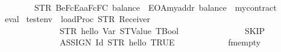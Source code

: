 \begin{isabellebody}
\ \ \ \ \ \ \ \ \ \ \ \ {\isacharbrackleft}{\kern0pt}{\isacharbrackright}{\kern0pt}\isanewline
\ \ \ \ \ \ \ {\isacharequal}{\kern0pt}\ STR\ {\isacharprime}{\kern0pt}{\isacharprime}{\kern0pt}{}{}{}Be{}{}{}{}FcEa{}{}aF{}{}{}{}{}{}{}{}{}c{}{}F{}{}{}{}{}{}C{}{}{}{\isacharcolon}{\kern0pt}\ balance{\isacharequal}{\kern0pt}{\isacharequal}{\kern0pt}{}{}\ {\isacharminus}{\kern0pt}\ EOA{\isasymnewline}myaddr{\isacharcolon}{\kern0pt}\ balance{\isacharequal}{\kern0pt}{\isacharequal}{\kern0pt}{}{}{}\ {\isacharminus}{\kern0pt}\ mycontract{\isacharparenleft}{\kern0pt}{\isacharparenright}{\kern0pt}{\isacharprime}{\kern0pt}{\isacharprime}{\kern0pt}{\isachardoublequoteclose}\isanewline
%
\isadelimproof
\ \ %
\endisadelimproof
%
\isatagproof
{}\isamarkupfalse%
\ {\isacharparenleft}{\kern0pt}eval{\isacharparenright}{\kern0pt}%
\endisatagproof
{\isafoldproof}%
%
\isadelimproof
\isanewline
%
\endisadelimproof
\isanewline
{}\isamarkupfalse%
\ {\isachardoublequoteopen}testenv{}\ {\isasymequiv}\ loadProc\ {\isacharparenleft}{\kern0pt}STR\ {\isacharprime}{\kern0pt}{\isacharprime}{\kern0pt}Receiver{\isacharprime}{\kern0pt}{\isacharprime}{\kern0pt}{\isacharparenright}{\kern0pt}\isanewline
\ \ \ \ \ \ \ \ \ \ \ \ \ \ {\isacharparenleft}{\kern0pt}{\isacharbrackleft}{\kern0pt}{\isacharparenleft}{\kern0pt}STR\ {\isacharprime}{\kern0pt}{\isacharprime}{\kern0pt}hello{\isacharprime}{\kern0pt}{\isacharprime}{\kern0pt}{\isacharcomma}{\kern0pt}\ Var\ {\isacharparenleft}{\kern0pt}STValue\ TBool{\isacharparenright}{\kern0pt}{\isacharparenright}{\kern0pt}{\isacharbrackright}{\kern0pt}{\isacharcomma}{\kern0pt}\isanewline
\ \ \ \ \ \ \ \ \ \ \ \ \ \ {\isacharparenleft}{\kern0pt}{\isacharbrackleft}{\kern0pt}{\isacharbrackright}{\kern0pt}{\isacharcomma}{\kern0pt}\ SKIP{\isacharparenright}{\kern0pt}{\isacharcomma}{\kern0pt}\isanewline
\ \ \ \ \ \ \ \ \ \ \ \ \ \ ASSIGN\ {\isacharparenleft}{\kern0pt}Id\ {\isacharparenleft}{\kern0pt}STR\ {\isacharprime}{\kern0pt}{\isacharprime}{\kern0pt}hello{\isacharprime}{\kern0pt}{\isacharprime}{\kern0pt}{\isacharparenright}{\kern0pt}{\isacharparenright}{\kern0pt}\ TRUE{\isacharparenright}{\kern0pt}\isanewline
\ \ \ \ \ \ \ \ \ \ \ \ fmempty{\isachardoublequoteclose}\isanewline

\end{isabellebody}
